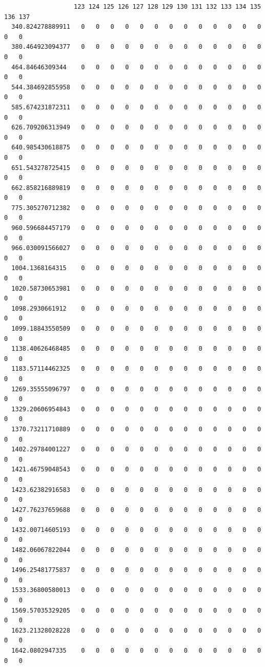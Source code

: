 \documentclass[
  letterpaper,
  DIV=11,
  numbers=noendperiod]{scrartcl}
\begin{document}
\begin{verbatim}
                   123 124 125 126 127 128 129 130 131 132 133 134 135 136 137
  340.824278889911   0   0   0   0   0   0   0   0   0   0   0   0   0   0   0
  380.464923094377   0   0   0   0   0   0   0   0   0   0   0   0   0   0   0
  464.84646309344    0   0   0   0   0   0   0   0   0   0   0   0   0   0   0
  544.384692855958   0   0   0   0   0   0   0   0   0   0   0   0   0   0   0
  585.674231872311   0   0   0   0   0   0   0   0   0   0   0   0   0   0   0
  626.709206313949   0   0   0   0   0   0   0   0   0   0   0   0   0   0   0
  640.985430618875   0   0   0   0   0   0   0   0   0   0   0   0   0   0   0
  651.543278725415   0   0   0   0   0   0   0   0   0   0   0   0   0   0   0
  662.858216889819   0   0   0   0   0   0   0   0   0   0   0   0   0   0   0
  775.305270712382   0   0   0   0   0   0   0   0   0   0   0   0   0   0   0
  960.596684457179   0   0   0   0   0   0   0   0   0   0   0   0   0   0   0
  966.030091566027   0   0   0   0   0   0   0   0   0   0   0   0   0   0   0
  1004.1368164315    0   0   0   0   0   0   0   0   0   0   0   0   0   0   0
  1020.58730653981   0   0   0   0   0   0   0   0   0   0   0   0   0   0   0
  1098.2930661912    0   0   0   0   0   0   0   0   0   0   0   0   0   0   0
  1099.18843550509   0   0   0   0   0   0   0   0   0   0   0   0   0   0   0
  1138.40626468485   0   0   0   0   0   0   0   0   0   0   0   0   0   0   0
  1183.57114462325   0   0   0   0   0   0   0   0   0   0   0   0   0   0   0
  1269.35555096797   0   0   0   0   0   0   0   0   0   0   0   0   0   0   0
  1329.20606954843   0   0   0   0   0   0   0   0   0   0   0   0   0   0   0
  1370.73211710889   0   0   0   0   0   0   0   0   0   0   0   0   0   0   0
  1402.29784001227   0   0   0   0   0   0   0   0   0   0   0   0   0   0   0
  1421.46759048543   0   0   0   0   0   0   0   0   0   0   0   0   0   0   0
  1423.62382916583   0   0   0   0   0   0   0   0   0   0   0   0   0   0   0
  1427.76237659688   0   0   0   0   0   0   0   0   0   0   0   0   0   0   0
  1432.00714605193   0   0   0   0   0   0   0   0   0   0   0   0   0   0   0
  1482.06067822044   0   0   0   0   0   0   0   0   0   0   0   0   0   0   0
  1496.25481775837   0   0   0   0   0   0   0   0   0   0   0   0   0   0   0
  1533.36800580013   0   0   0   0   0   0   0   0   0   0   0   0   0   0   0
  1569.57035329205   0   0   0   0   0   0   0   0   0   0   0   0   0   0   0
  1623.21328028228   0   0   0   0   0   0   0   0   0   0   0   0   0   0   0
  1642.0802947335    0   0   0   0   0   0   0   0   0   0   0   0   0   0   0

\end{verbatim}
\end{document}
